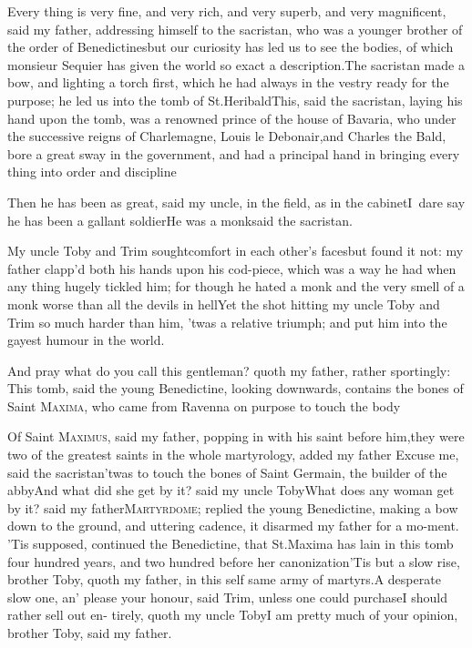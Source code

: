 \documentclass{article}
\begin{document}
Every thing is very fine, and very rich, and very superb, and very magnificent, said
my father, addressing himself to the sacristan, who was a younger brother of the
order of Benedictines\tsk but our curiosity has led us to see the bodies, of which
monsieur Sequier has given the world so exact a description.\tsk The sacristan made a
bow, and lighting a torch first, which he had always in the vestry ready for the
purpose; he led us into the
tomb of St.\@ Heribald\tsh This, said the sacristan,
laying his hand upon the tomb, was a renowned prince of the house of Bavaria, who
under the successive reigns of Charlemagne, Louis le Debonair,\break and Charles the
Bald, bore a great sway in the government, and had a principal hand in bringing
every thing into order and discipline\tsh

Then he has been as great, said my uncle, in the field, as in
the cabinet\tsk I~dare say he has been a gallant
soldier\break\tsh He was a monk\tsk said the sacristan.

My uncle Toby and Trim sought\break comfort in each
other’s faces\tsk but found it not: my father clapp’d both
his hands upon his cod-piece, which was a way he had when any thing
hugely tickled him; for though he hated a monk and the very smell
of a monk worse than all the devils in hell\tsh Yet the
shot hitting my uncle Toby and Trim so much harder
than him, ’twas a relative triumph; and put him into the
gayest humour in the world.

\tsh And pray what do you call this gentleman? quoth my
father, rather sportingly: This tomb, said the young
Benedictine, looking downwards, contains the bones of Saint
\textsc{Maxima}, who came from Ravenna on purpose to
touch the body\tsh

\tsh Of Saint \textsc{Maximus}, said my fa\-ther, popping in with his saint before
him,\break\tsk they were two of the greatest saints in the whole martyrology, added
my father
\tsh Excuse me, said the sacristan\tsh\break\tsh ’twas to touch the bones
of Saint Germain, the builder of the abby\tsh And what did she
get by it? said my uncle Toby\tsh What does any woman get by it?
said my father\tsh \textsc{Martyrdome}; replied the young
Benedictine, making a bow down to the ground, and uttering 
cadence, it disarmed my
father for a mo-\break ment. ’Tis supposed, continued the Bene\-dictine,
that St.\@ Maxima has lain in this tomb four hundred years, and
two hundred before her canonization\tsh ’Tis but a slow rise,
brother Toby, quoth my father, in this self same army of
martyrs.\break\tsh A desperate slow one, an’ please your honour, said
Trim, unless one could purchase\tsh I should rather sell out
en- tirely, quoth my uncle Toby\tsh I am pretty much of your
opinion, brother Toby, said my father.
\end{document}

